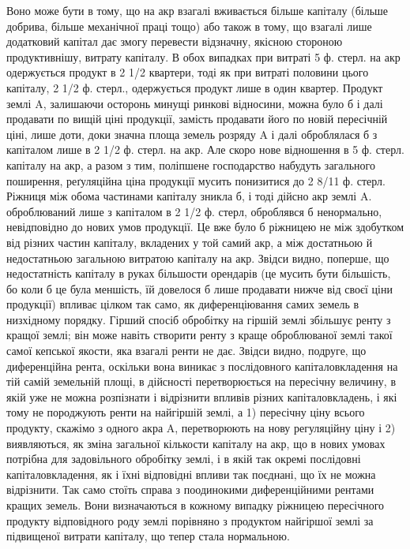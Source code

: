 Воно може бути в тому, що на акр взагалі вживається більше капіталу (більше
добрива, більше механічної праці тощо) або також в тому, що взагалі лише
додатковий капітал дає змогу перевести відзначну, якісною стороною продуктивнішу,
витрату капіталу. В обох випадках при витраті 5 ф. стерл. на акр одержується
продукт в 2 1/2 квартери, тоді як при витраті половини цього капіталу,
2 1/2 ф. стерл., одержується продукт лише в один квартер. Продукт землі A,
залишаючи осторонь минущі ринкові відносини, можна було б і далі продавати
по вищій ціні продукції, замість продавати його по новій пересічній
ціні, лише доти, доки значна площа земель розряду A і далі оброблялася б
з капіталом лише в 2 1/2 ф. стерл. на акр. Але скоро нове відношення
в 5 ф. стерл. капіталу на акр, а разом з тим, поліпшене господарство набудуть
загального поширення, реґуляційна ціна продукції мусить понизитися до 2 8/11 ф.
стерл. Ріжниця між обома частинами капіталу зникла б, і тоді дійсно акр землі A.
оброблюваний лише з капіталом в 2 1/2 ф. стерл, оброблявся б ненормально,
невідповідно до нових умов продукції. Це вже було б ріжницею не між здобутком від
різних частин капіталу, вкладених у той самий акр, а між достатньою й недостатньою
загальною витратою капіталу на акр. Звідси видно, поперше, що недостатність
капіталу в руках більшости орендарів (це мусить бути більшість, бо коли б це
була меншість, їй довелося б лише продавати нижче від своєї ціни продукції)
впливає цілком так само, як диференціювання самих земель в низхідному порядку.
Гірший спосіб обробітку на гіршій землі збільшує ренту з кращої землі;
він може навіть створити ренту з краще оброблюваної землі такої самої кепської
якости, яка взагалі ренти не дає. Звідси видно, подруге, що диференційна рента,
оскільки вона виникає з послідовного капіталовкладення на тій самій земельній
площі, в дійсності перетворюється на пересічну величину, в якій уже не можна
розпізнати і відрізнити впливів різних капіталовкладень, і які тому не породжують
ренти на найгіршій землі, а 1) пересічну ціну всього продукту, скажімо
з одного акра A, перетворюють на нову регуляційну ціну і 2) виявляються, як
зміна загальної кількости капіталу на акр, що в нових умовах потрібна для
задовільного обробітку землі, і в якій так окремі послідовні капіталовкладення, як і
їхні відповідні впливи так поєднані, що їх не можна відрізнити. Так само стоїть
справа з поодинокими диференційними рентами кращих земель. Вони визначаються
в кожному випадку ріжницею пересічного продукту відповідного роду землі порівняно
з продуктом найгіршої землі за підвищеної витрати капіталу, що тепер
стала нормальною.

